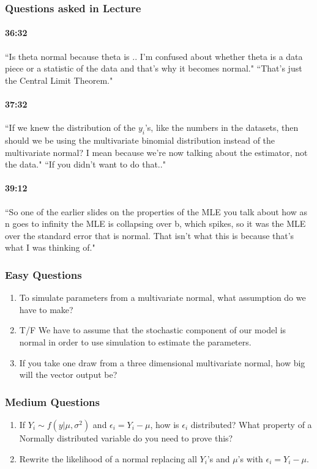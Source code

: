 \documentclass[11pt]{article}
\begin{document}
\subsubsection{Questions asked in Lecture}
\paragraph{36:32}  ``Is theta normal because theta is .. I'm confused about whether theta is a data piece or a statistic of the data and that's why it becomes normal."  ``That's just the Central Limit Theorem."
\paragraph{37:32}``If we knew the distribution of the $y_i$'s, like the numbers in the datasets, then should we be using the multivariate binomial distribution instead of the multivariate normal? I mean because we're now talking about the estimator, not the data." ``If you didn't want to do that.."
\paragraph{39:12} ``So one of the earlier slides on the properties of the MLE you talk about how as n goes to infinity the MLE is collapsing over b,  which spikes, so it was the MLE over the standard error that is normal. That isn't what this is because that's what I was thinking of."

\subsubsection{Easy Questions}
\begin{enumerate}
\item To simulate parameters from a multivariate normal, what assumption do we have to make? 
\item T/F We have to assume that the stochastic component of our model is normal in order to use simulation to estimate the parameters. 
\item If you take one draw from a three dimensional multivariate normal, how big will the vector output be? 
\end{enumerate}

\subsubsection{Medium Questions}
\begin{enumerate}
\item If $Y_i \sim f(y|\mu, \sigma^2)$ and $\epsilon_i = Y_i - \mu$, how is $\epsilon_i$ distributed?  What property of a Normally distributed variable do you need to prove this?  
\item Rewrite the likelihood of a normal replacing all $Y_i$'s and $\mu$'s with $\epsilon_i = Y_i - \mu$. 
\end{enumerate}
\end{document}
